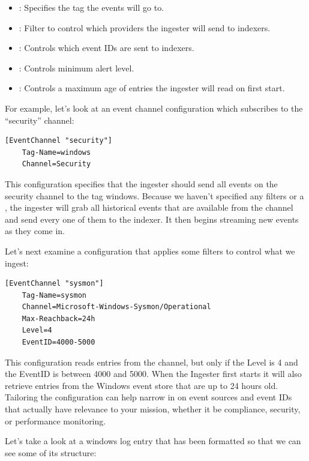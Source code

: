 \begin{itemize}
\item {}: Specifies the tag the events will go to.
\item {}: Filter to control which providers the ingester will send to indexers.
\item {}: Controls which event IDs are sent to indexers.
\item {}: Controls minimum alert level.
\item {}: Controls a maximum age of entries the ingester will read on first start.
\end{itemize}

For example, let's look at an event channel configuration which
subscribes to the ``security'' channel:

\begin{Verbatim}[breaklines=true]
[EventChannel "security"]
    Tag-Name=windows
    Channel=Security
\end{Verbatim}

This configuration specifies that the ingester should send all events
on the security channel to the tag windows. Because we haven't
specified any filters or a , the ingester will grab all
historical events that are available from the  channel and
send every one of them to the indexer. It then begins streaming new
events as they come in.

Let's next examine a configuration that applies some
filters to control what we ingest:

\begin{Verbatim}[breaklines=true]
[EventChannel "sysmon"]
    Tag-Name=sysmon
    Channel=Microsoft-Windows-Sysmon/Operational
    Max-Reachback=24h
    Level=4
    EventID=4000-5000
\end{Verbatim}

This configuration reads entries from the
 channel, but only if the Level
is 4 and the EventID is between 4000 and 5000. When the Ingester first
starts it will also retrieve entries from the Windows event store that
are up to 24 hours old. Tailoring the configuration can help narrow in
on event sources and event IDs that actually have relevance to your
mission, whether it be compliance, security, or performance monitoring.

Let's take a look at a windows log entry that has been formatted so
that we can see some of its structure:

